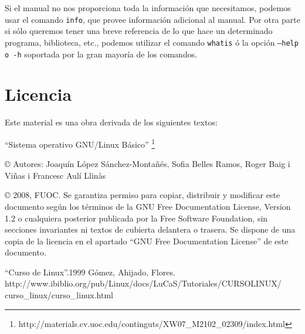 \documentclass[12pt]{article}
\begin{document}
	

Si el manual no nos proporciona toda la información que necesitamos, podemos 
usar el comando \texttt{info}, que provee información adicional al manual. Por otra parte
si sólo queremos tener una breve referencia de lo que hace un determinado programa, 
biblioteca, etc., podemos utilizar el comando \texttt{whatis} ó la opción \texttt{--help o -h}
soportada por la gran mayoría de los comandos.


\section{Licencia}

Este material es una obra derivada de los siguientes textos:

``Sistema operativo GNU/Linux Básico'' \footnote{http://materials.cv.uoc.edu/continguts/XW07\_M2102\_02309/index.html}

© Autores: Joaquín López Sánchez-Montañés, Sofia Belles Ramos, Roger Baig i Viñas i Francesc Aulí Llinàs

© 2008, FUOC. Se garantiza permiso para copiar, distribuir y modificar este documento según los
términos de la GNU Free Documentation License, Version 1.2 o cualquiera posterior publicada por la
Free Software Foundation, sin secciones invariantes ni textos de cubierta delantera o trasera. Se dispone
de una copia de la licencia en el apartado ``GNU Free Documentation License'' de este documento.

\begin{thebibliography}{1}
 ``Curso de Linux''.1999 Gómez, Ahijado, Flores.\\ 
http://www.ibiblio.org/pub/Linux/docs/LuCaS/Tutoriales/CURSOLINUX/\\curso\_linux/curso\_linux.html
\end{thebibliography}
\end{document}
